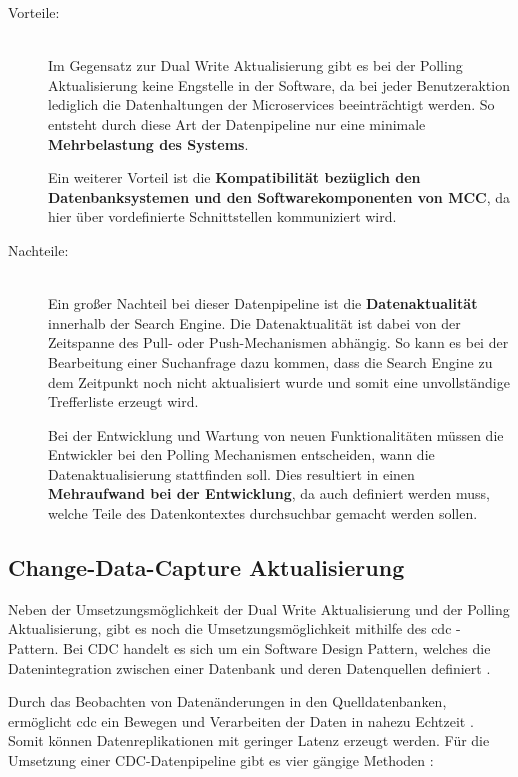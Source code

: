 \begin{description}
    \item[Vorteile:]\hfill \\
    Im Gegensatz zur Dual Write Aktualisierung gibt es bei der Polling Aktualisierung keine Engstelle in der Software, da bei jeder Benutzeraktion lediglich die Datenhaltungen der Microservices beeinträchtigt werden. So entsteht durch diese Art der Datenpipeline nur eine minimale \textbf{Mehrbelastung des Systems}.

    Ein weiterer Vorteil ist die \textbf{Kompatibilität bezüglich den Datenbanksystemen und den Softwarekomponenten von MCC}, da hier über vordefinierte Schnittstellen kommuniziert wird.
    
    \item[Nachteile:]\hfill \\
    Ein großer Nachteil bei dieser Datenpipeline ist die \textbf{Datenaktualität} innerhalb der Search Engine. Die Datenaktualität ist dabei von der Zeitspanne des Pull- oder Push-Mechanismen abhängig. So kann es bei der Bearbeitung einer Suchanfrage dazu kommen, dass die Search Engine zu dem Zeitpunkt noch nicht aktualisiert wurde und somit eine unvollständige Trefferliste erzeugt wird.

    Bei der Entwicklung und Wartung von neuen Funktionalitäten müssen die Entwickler bei den Polling Mechanismen entscheiden, wann die Datenaktualisierung stattfinden soll. Dies resultiert in einen \textbf{Mehraufwand bei der Entwicklung}, da auch definiert werden muss, welche Teile des Datenkontextes \glqq durchsuchbar\grqq{} gemacht werden sollen.

\end{description}

\subsection{Change-Data-Capture Aktualisierung\label{subsec4.1.4:Unterunterpunkt-4}}

Neben der Umsetzungsmöglichkeit der Dual Write Aktualisierung und der Polling Aktualisierung, gibt es noch die Umsetzungsmöglichkeit mithilfe des \gls{cdc} - Pattern. Bei CDC handelt es sich um ein Software Design Pattern, welches die Datenintegration zwischen einer Datenbank und deren Datenquellen definiert \cite{Datenbankenverstehen.de.2021}.

Durch das Beobachten von Datenänderungen in den Quelldatenbanken, ermöglicht \gls{cdc} ein Bewegen und Verarbeiten der Daten in nahezu Echtzeit \cite{JohnKutay.2021}. Somit können Datenreplikationen mit geringer Latenz erzeugt werden. Für die Umsetzung einer CDC-Datenpipeline gibt es vier gängige Methoden \cite{MarkVandeWiel.2021}:

